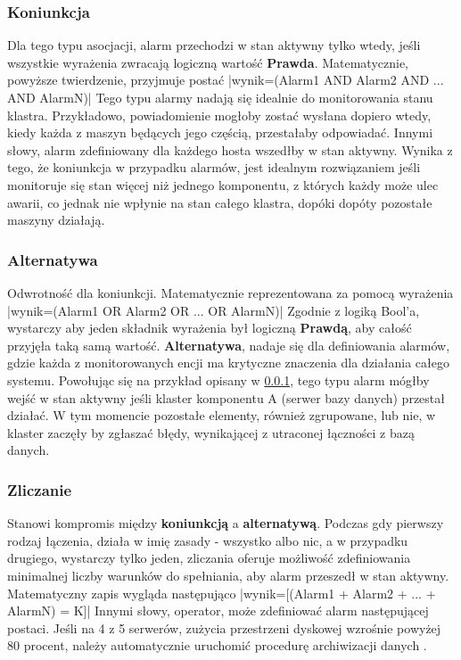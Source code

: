         \subsubsection{Koniunkcja}
        \label{chapter:monitoring:anatomy_of_alarm:assocation:and}
        Dla tego typu asocjacji, alarm przechodzi w stan aktywny tylko wtedy, jeśli wszystkie wyrażenia
        zwracają logiczną wartość \textbf{Prawda}. Matematycznie, powyższe twierdzenie, przyjmuje postać
        |wynik=(Alarm1 AND Alarm2 AND ... AND AlarmN)|
        Tego typu alarmy nadają się idealnie
        do monitorowania stanu klastra. Przykładowo, powiadomienie mogłoby zostać wysłana dopiero 
        wtedy, kiedy każda z maszyn będących jego częścią, przestałaby odpowiadać. Innymi słowy,
        alarm zdefiniowany dla każdego hosta wszedłby w stan aktywny. Wynika z tego, że koniunkcja
        w przypadku alarmów, jest idealnym rozwiązaniem jeśli monitoruje się stan więcej niż jednego
        komponentu, z których każdy może ulec awarii, co jednak nie wpłynie na stan całego klastra, dopóki
        dopóty pozostałe maszyny działają.
        
        \subsubsection{Alternatywa}
        Odwrotność dla koniunkcji. Matematycznie reprezentowana za pomocą wyrażenia
        |wynik=(Alarm1 OR Alarm2 OR ... OR AlarmN)|
        Zgodnie z logiką Bool'a, wystarczy aby jeden
        składnik wyrażenia był logiczną \textbf{Prawdą}, aby całość przyjęła taką samą wartość. \textbf{Alternatywa},
        nadaje się dla definiowania alarmów, gdzie każda z monitorowanych encji ma krytyczne znaczenia dla działania całego systemu.
        Powołując się na przykład opisany w \ref{chapter:monitoring:anatomy_of_alarm:assocation:and}, tego typu
        alarm mógłby wejść w stan aktywny jeśli klaster komponentu A (serwer bazy danych) przestał działać. W tym momencie pozostałe
        elementy, również zgrupowane, lub nie, w klaster zaczęły by zgłaszać błędy, wynikającej z utraconej łączności
        z bazą danych.
        
        \subsubsection{Zliczanie}
        Stanowi kompromis między \textbf{koniunkcją} a \textbf{alternatywą}. Podczas gdy pierwszy rodzaj łączenia, działa
        w imię zasady - wszystko albo nic, a w przypadku drugiego, wystarczy tylko jeden, zliczania oferuje możliwość
        zdefiniowania minimalnej liczby warunków do spełniania, aby alarm przeszedł w stan aktywny.
        Matematyczny zapis wygląda następująco
        |wynik=[(Alarm1 + Alarm2 + ... + AlarmN) = K]|
        Innymi słowy, operator, może zdefiniować alarm następującej postaci. Jeśli na 4 z 5 serwerów, zużycia przestrzeni dyskowej
        wzrośnie powyżej 80 procent, należy automatycznie uruchomić procedurę archiwizacji danych \cite{monitoring_and_alerting}. 
